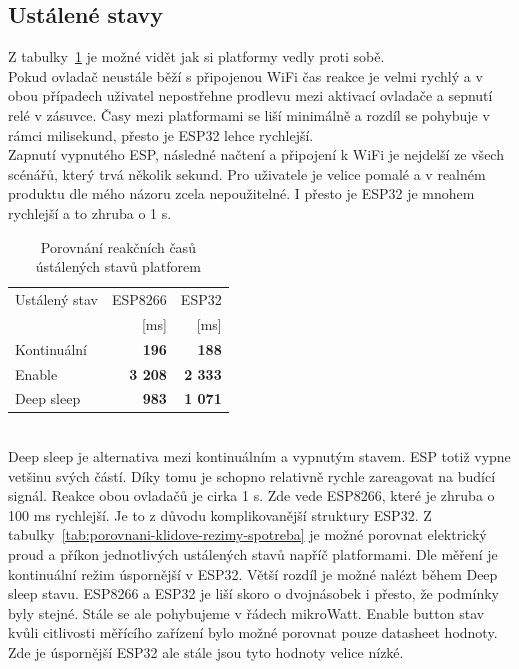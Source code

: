 \documentclass[a4paper, 12pt]{report}
\begin{document}
    \subsection{Ustálené stavy}
    Z tabulky~\ref{tab:porovnani-klidove-rezimy-cas} je možné vidět jak si platformy vedly proti sobě. \\
    Pokud ovladač neustále běží s připojenou WiFi čas reakce je velmi rychlý a v obou případech uživatel nepostřehne prodlevu mezi aktivací ovladače a sepnutí relé v zásuvce. Časy mezi platformami se liší minimálně a rozdíl se pohybuje v rámci milisekund, přesto je ESP32 lehce rychlejší. \\
    Zapnutí vypnutého ESP, následné načtení a připojení k WiFi je nejdelší ze všech scénářů, který trvá několik sekund. Pro uživatele je velice pomalé a v realném produktu dle mého názoru zcela nepoužitelné. I přesto je ESP32 je mnohem rychlejší a to zhruba o 1 \si{s}.
    \begin{table}[h!]
        \centering
        \caption{Porovnání reakčních časů ústálených stavů platforem}
        \begin{tabular}{||l|r r||}
            \hline
            Ustálený stav & ESP8266        & ESP32          \\
            & [ms]           & [ms]           \\
            \hline
            Kontinuální   & \textbf{196}   & \textbf{188}   \\
            Enable        & \textbf{3 208} & \textbf{2 333} \\
            Deep sleep    & \textbf{983}   & \textbf{1 071} \\
            \hline
        \end{tabular}
        \label{tab:porovnani-klidove-rezimy-cas}
    \end{table}\\
    Deep sleep je alternativa mezi kontinuálním a vypnutým stavem. ESP totiž vypne vetšinu svých částí. Díky tomu je schopno relativně rychle zareagovat na budící signál. Reakce obou ovladačů je cirka 1 \si{s}. Zde vede ESP8266, které je zhruba o 100 \si{ms} rychlejší. Je to z důvodu komplikovanější struktury ESP32.
    Z tabulky~\ref{tab:porovnani-klidove-rezimy-spotreba} je možné porovnat elektrický proud a příkon jednotlivých ustálených stavů napříč platformami. Dle měření je kontinuální režim úspornější v ESP32. Větší rozdíl je možné nalézt během Deep sleep stavu. ESP8266 a ESP32 je liší skoro o dvojnásobek i přesto, že podmínky byly stejné. Stále se ale pohybujeme v řádech mikroWatt. Enable button stav kvůli citlivosti měřícího zařízení bylo možné porovnat pouze datasheet hodnoty. Zde je úspornější ESP32 ale stále jsou tyto hodnoty velice nízké.
\end{document}
